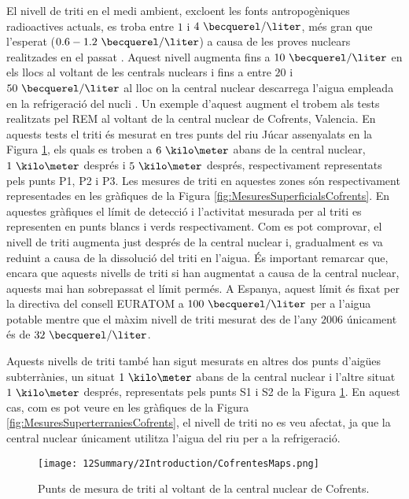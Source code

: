 El nivell de triti en el medi ambient, excloent les fonts antropogèniques radioactives actuals, es troba entre $1$ i $4~\becquerel/\liter$, més gran que l'esperat ($0.6-1.2~\becquerel/\liter$) a causa de les proves nuclears realitzades en el passat \cite{FranceTritiumEnvironment}. Aquest nivell augmenta fins a $10~\becquerel/\liter$ en els llocs al voltant de les centrals nuclears i fins a entre $20$ i $50~\becquerel/\liter$ al lloc on la central nuclear descarrega l'aigua empleada en la refrigeració del nucli \cite{FranceTritiumEnvironment}. Un exemple d'aquest augment el trobem als tests realitzats pel REM al voltant de la central nuclear de Cofrents, Valencia. En aquests tests el triti és mesurat en tres punts del riu Júcar assenyalats en la Figura \ref{fig:PuntsMesuraTritiCofrents}, els quals es troben a $6~\kilo\meter$ abans de la central nuclear, $1~\kilo\meter$ després i $5~\kilo\meter$ després, respectivament representats pels punts P1, P2 i P3. Les mesures de triti en aquestes zones són respectivament representades en les gràfiques de la Figura \ref{fig:MesuresSuperficialsCofrents}. En aquestes gràfiques el límit de detecció i l'activitat mesurada per al triti es representen en punts blancs i verds respectivament. Com es pot comprovar, el nivell de triti augmenta just després de la central nuclear i, gradualment es va reduint a causa de la dissolució del triti en l'aigua. És important remarcar que, encara que aquests nivells de triti si han augmentat a causa de la central nuclear, aquests mai han sobrepassat el límit permés. A Espanya, aquest límit és fixat per la directiva del consell EURATOM a $100~\becquerel/\liter$ per a l'aigua potable \cite{100BqL} mentre que el màxim nivell de triti mesurat des de l'any $2006$ únicament és de $32~\becquerel/\liter$.

Aquests nivells de triti també han sigut mesurats en altres dos punts d'aigües subterrànies, un situat $1~\kilo\meter$ abans de la central nuclear i l'altre situat $1~\kilo\meter$ després, representats pels punts S1 i S2 de la Figura \ref{fig:PuntsMesuraTritiCofrents}. En aquest cas, com es pot veure en les gràfiques de la Figura \ref{fig:MesuresSuperterraniesCofrents}, el nivell de triti no es veu afectat, ja que la central nuclear únicament utilitza l'aigua del riu per a la refrigeració.

\begin{figure}[hbtp]
\texttt{[image: 12Summary/2Introduction/CofrentesMaps.png]}
\centering
\caption{Punts de mesura de triti al voltant de la central nuclear de Cofrents.\label{fig:PuntsMesuraTritiCofrents}}
\end{figure}

